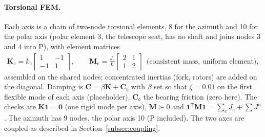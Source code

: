 \documentclass[10pt,a4paper]{article}
\numberwithin{equation}{section}
\begin{document}
\paragraph{Torsional FEM.} Each axis is a chain of two-node torsional elements, 8 for the azimuth and 10 for the polar axis (polar element 3, the telescope seat, has no shaft and joins nodes 3 and 4 into P), with element matrices
\begin{gather}
\mathbf K_e = k_e\begin{bmatrix}1&-1\\-1&1\end{bmatrix}, \qquad \mathbf M_e = \frac{J_e}{6}\begin{bmatrix}2&1\\1&2\end{bmatrix}\ \ \text{(consistent mass, uniform element)},
\end{gather}
assembled on the shared nodes; concentrated inertias (fork, rotors) are added on the diagonal. Damping is $\mathbf C = \beta\mathbf K + \mathbf C_b$ with $\beta$ set so that $\zeta = 0.01$ on the first flexible mode of each axis (placeholder), $\mathbf C_b$ the bearing friction (zero here). The checks are $\mathbf K\mathbf 1 = \mathbf 0$ (one rigid mode per axis), $\mathbf M \succ 0$ and $\mathbf 1^{\mathsf T}\mathbf M\mathbf 1 = \sum_e J_e + \sum J^n$. The azimuth has 9 nodes, the polar axis 10 (P included). The two axes are coupled as described in Section~\ref{subsec:coupling}.
\end{document}
